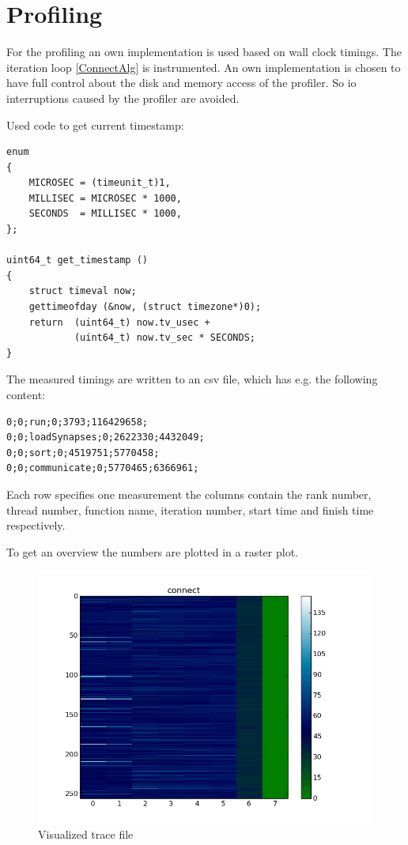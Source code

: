 %

\chapter{Profiling}

For the profiling an own implementation is used based on wall clock timings.
The iteration loop \ref{ConnectAlg} is instrumented. An own implementation is
chosen to have full control about the disk and memory access of the profiler.
So io interruptions caused by the profiler are avoided.

Used code to get current timestamp:

\begin{lstlisting}
enum
{
	MICROSEC = (timeunit_t)1,
	MILLISEC = MICROSEC * 1000,
	SECONDS  = MILLISEC * 1000,
};

uint64_t get_timestamp ()
{
    struct timeval now;
    gettimeofday (&now, (struct timezone*)0);
    return  (uint64_t) now.tv_usec + 
            (uint64_t) now.tv_sec * SECONDS;
}
\end{lstlisting}


The measured timings are written to an csv file, which has e.g. the following content:
\begin{lstlisting}
0;0;run;0;3793;116429658;
0;0;loadSynapses;0;2622330;4432049;
0;0;sort;0;4519751;5770458;
0;0;communicate;0;5770465;6366961;
\end{lstlisting}
Each row specifies one measurement the columns contain the rank number, thread number, function name,
iteration number, start time and finish time respectively.

To get an overview the numbers are plotted in a raster plot.

\begin{figure}[ht!]
\centering
\includegraphics[scale=0.4]{pictures/1per300_tracefile_connect.png}
\caption{Visualized trace file}
\end{figure}
